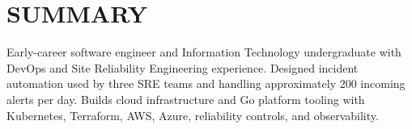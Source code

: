 \section{SUMMARY}

Early-career software engineer and Information Technology undergraduate with DevOps and Site Reliability Engineering experience. Designed incident automation used by three SRE teams and handling approximately 200 incoming alerts per day. Builds cloud infrastructure and Go platform tooling with Kubernetes, Terraform, AWS, Azure, reliability controls, and observability.
